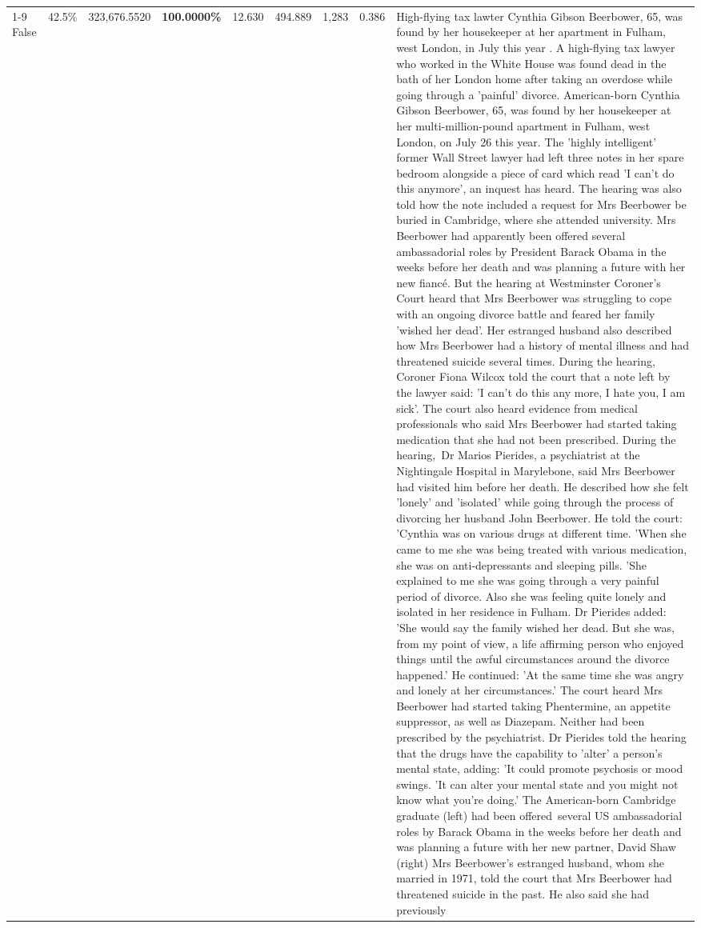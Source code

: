 \begin{table}[H]
\begin{tabular}{lllrlllll}
\cline{1-9}
False & 42.5\% & 323,676.5520 & \bfseries \color{red} 100.0000\% & 12.630 & 494.889 & 1,283 & 0.386 & High-flying tax lawter Cynthia Gibson Beerbower, 65, was found by her housekeeper at her apartment in Fulham, west London, in July this year . A high-flying tax lawyer who worked in the White House was found dead in the bath of her London home after taking an overdose while going through a 'painful' divorce. American-born Cynthia Gibson Beerbower, 65, was found by her housekeeper at her multi-million-pound apartment in Fulham, west London, on July 26 this year. The 'highly intelligent' former Wall Street lawyer had left three notes in her spare bedroom alongside a piece of card which read 'I can't do this anymore', an inquest has heard. The hearing was also told how the note included a request for Mrs Beerbower be buried in Cambridge, where she attended university. Mrs Beerbower had apparently been offered several ambassadorial roles by President Barack Obama in the weeks before her death and was planning a future with her new fiancé. But the hearing at Westminster Coroner's Court heard that Mrs Beerbower was struggling to cope with an ongoing divorce battle and feared her family 'wished her dead'. Her estranged husband also described how Mrs Beerbower had a history of mental illness and had threatened suicide several times. During the hearing, Coroner Fiona Wilcox told the court that a note left by the lawyer said: 'I can't do this any more, I hate you, I am sick'. The court also heard evidence from medical professionals who said Mrs Beerbower had started taking medication that she had not been prescribed. During the hearing, Dr Marios Pierides, a psychiatrist at the Nightingale Hospital in Marylebone, said Mrs Beerbower had visited him before her death. He described how she felt 'lonely' and 'isolated' while going through the process of divorcing her husband John Beerbower. He told the court: 'Cynthia was on various drugs at different time. 'When she came to me she was being treated with various medication, she was on anti-depressants and sleeping pills. 'She explained to me she was going through a very painful period of divorce. Also she was feeling quite lonely and isolated in her residence in Fulham. Dr Pierides added: 'She would say the family wished her dead. But she was, from my point of view, a life affirming person who enjoyed things until the awful circumstances around the divorce happened.' He continued: 'At the same time she was angry and lonely at her circumstances.' The court heard Mrs Beerbower had started taking Phentermine, an appetite suppressor, as well as Diazepam. Neither had been prescribed by the psychiatrist. Dr Pierides told the hearing that the drugs have the capability to 'alter' a person's mental state, adding: 'It could promote psychosis or mood swings. 'It can alter your mental state and you might not know what you're doing.' The American-born Cambridge graduate (left) had been offered several US ambassadorial roles by Barack Obama in the weeks before her death and was planning a future with her new partner, David Shaw (right) Mrs Beerbower's estranged husband, whom she married in 1971, told the court that Mrs Beerbower had threatened suicide in the past. He also said she had previously 
\end{tabular}
\end{table}
